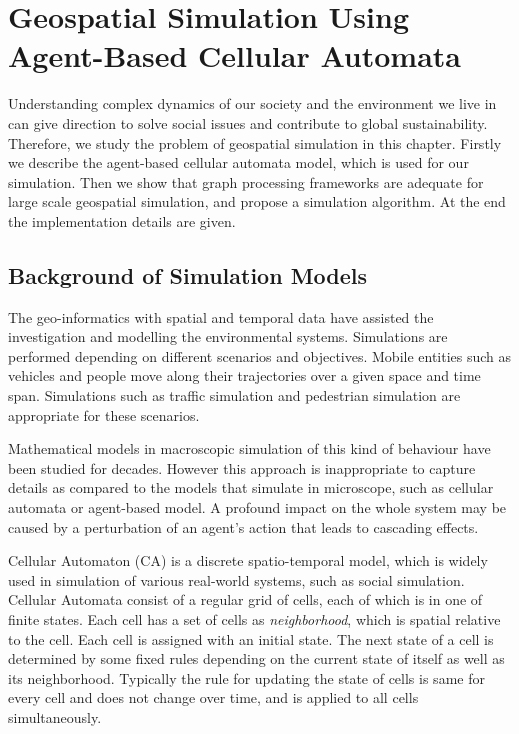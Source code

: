 \chapter{Geospatial Simulation Using Agent-Based Cellular Automata}
\label{chap:c4}

Understanding complex dynamics of our society and the environment we live in can give direction to solve social issues and contribute to global sustainability. Therefore, we study the problem of geospatial simulation in this chapter. Firstly we describe the agent-based cellular automata model, which is used for our simulation. Then we show that graph processing frameworks are adequate for large scale geospatial simulation, and propose a simulation algorithm. At the end the implementation details are given.

\section{Background of Simulation Models}

The geo-informatics with spatial and temporal data have assisted the investigation and modelling the environmental systems. Simulations are performed depending on different scenarios and objectives. Mobile entities such as vehicles and people move along their trajectories over a given space and time span. Simulations such as traffic simulation and pedestrian simulation are appropriate for these scenarios. 

Mathematical models in macroscopic simulation of this kind of behaviour have been studied for decades. However this approach is inappropriate to capture details as compared to the models that simulate in microscope, such as cellular automata or agent-based model. A profound impact on the whole system may be caused by a perturbation of an agent's action that leads to cascading effects\cite{suzumura2014towards}.

Cellular Automaton (CA) is a discrete spatio-temporal model, which is widely used in simulation of various real-world systems, such as social simulation. Cellular Automata consist of a regular grid of cells, each of which is in one of finite states. Each cell has a set of cells as \textit{neighborhood}, which is spatial relative to the cell. Each cell is assigned with an initial state. The next state of a cell is determined by some fixed rules depending on the current state of itself as well as its neighborhood. Typically the rule for updating the state of cells is same for every cell and does not change over time, and is applied to all cells simultaneously.

